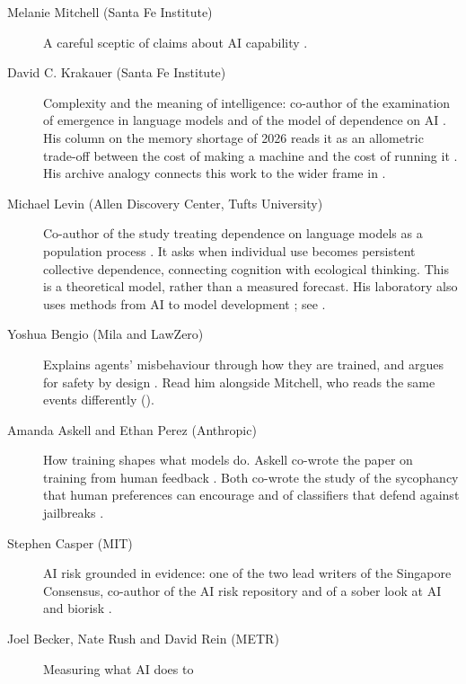 \begin{description}
  \item[Melanie Mitchell (Santa Fe Institute)] A careful sceptic of claims about
    AI capability
    \parencite{mitchell2026jagged,krakauer2026emergence,mitchell2026metaphors}.
  \item[David C. Krakauer (Santa Fe Institute)] Complexity and the meaning of
    intelligence: co-author of the examination of emergence in language models
    \parencite{krakauer2026emergence} and of the model of dependence on AI
    \parencite{sole2026cognitivevirus}. His column on the memory shortage of
    2026 reads it as an allometric trade-off between the cost of making a
    machine and the cost of running it \parencite{krakauer2026dram}. His
    archive analogy connects this work to the wider frame in
    .
  \item[Michael Levin (Allen Discovery Center, Tufts University)] Co-author of
    the study treating dependence on language models as a population process
    \parencite{sole2026cognitivevirus}. It asks when individual use becomes
    persistent collective dependence, connecting cognition with ecological
    thinking. This is a theoretical model, rather than a measured forecast.
    His laboratory also uses methods from AI to model development
    \parencite{hartl2026growthform}; see .
  \item[Yoshua Bengio (Mila and LawZero)] Explains agents' misbehaviour through
    how they are trained, and argues for safety by design
    \parencite{bengio2026lying,lu2026safetybydesign}. Read him alongside
    Mitchell, who reads the same events differently ().
  \item[Amanda Askell and Ethan Perez (Anthropic)] How training shapes what
    models do. Askell co-wrote the paper on training from human feedback
    \parencite{ouyang2022instructgpt}. Both co-wrote the study of the
    sycophancy that human preferences can encourage
    \parencite{sharma2024sycophancy} and of classifiers that defend against
    jailbreaks \parencite{sharma2025classifiers}.
  \item[Stephen Casper (MIT)] AI risk grounded in evidence: one of the two lead
    writers of the Singapore Consensus, co-author of the AI risk repository and
    of a sober look at AI and biorisk
    \parencite{casper2026singapore,slattery2026riskrepository,peppin2025biorisk}.
  \item[Joel Becker, Nate Rush and David Rein (METR)] Measuring what AI does to

\end{description}
